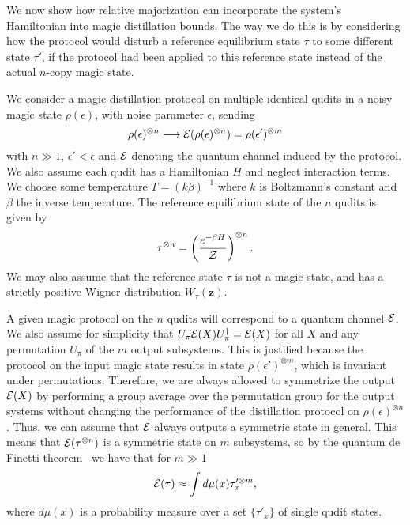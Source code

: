 \documentclass[
onecolumn,
superscriptaddress
]{revtex4-1}
\def\z{\boldsymbol{z}}
\def\Z{{\cal Z}}
\def\E{{\cal E}}
\begin{document}
We now show how relative majorization can incorporate the system's Hamiltonian into magic distillation bounds. The way we do this is by considering how the protocol would disturb a reference equilibrium state $\tau$ to some different state $\tau'$, if the protocol had been applied to this reference state instead of the actual $n$-copy magic state. 

We consider a magic distillation protocol on multiple identical qudits in a noisy magic state $\rho(\epsilon)$, with noise parameter $\epsilon$, sending 
\begin{equation}
\rho(\epsilon)^{\otimes n} \longrightarrow \E(\rho(\epsilon)^{\otimes n}) =\rho(\epsilon')^{\otimes m}
\end{equation}
with $n \gg 1$, $\epsilon' <\epsilon$ and $\E$ denoting the quantum channel induced by the protocol. We also assume each qudit has a Hamiltonian $H$ and neglect interaction terms. We choose some temperature $T = (k\beta)^{-1}$ where $k$ is Boltzmann's constant and $\beta$ the inverse temperature. The reference equilibrium state of the $n$ qudits is given by
\begin{equation}
\tau^{\otimes n} = \left ( \frac{e^{-\beta H}}{\Z} \right )  ^{\otimes n}.
\end{equation}
We may also assume that the reference state $\tau$ is not a magic state, and has a strictly positive Wigner distribution $W_\tau(\z)$.

A given magic protocol on the $n$ qudits will correspond to a quantum channel $\E$. We also assume for simplicity that $U_\pi\E(X) U_\pi^\dagger = \E(X)$ for all $X$ and any permutation $U_\pi$ of the $m$ output subsystems. This is justified because the protocol on the input magic state results in state $\rho(\epsilon')^{\otimes m}$, which is invariant under permutations. Therefore, we are always allowed to symmetrize the output $\E(X)$ by performing a group average over the permutation group for the output systems without changing the performance of the distillation protocol on $\rho(\epsilon)^{\otimes n}$. Thus, we can assume that $\E$ always outputs a symmetric state in general. This means that $\E(\tau^{\otimes n})$ is a symmetric state on $m$ subsystems, so by the quantum de Finetti theorem~\cite{hudson_locally_1976, christandl_2007} we have that for $m \gg 1$
\begin{equation}
\E(\tau) \approx \int d\mu(x) \tau_x^{\prime \otimes m},
\end{equation}
where $d\mu(x)$ is a probability measure over a set $\{\tau'_x\}$ of single qudit states.
\end{document}
